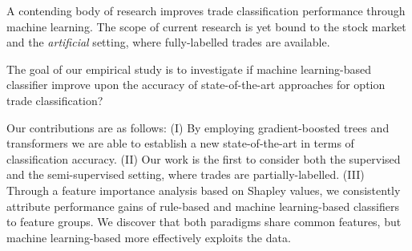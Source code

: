 A contending body of research \autocites{blazejewskiLocalNonParametricModel2005}{rosenthalModelingTradeDirection2012}{ronenMachineLearningTrade2022} improves trade classification performance through machine learning. The scope of current research is yet bound to the stock market and the \textit{artificial} setting, where fully-labelled trades are available. 

The goal of our empirical study is to investigate if  machine learning-based classifier improve upon the accuracy of state-of-the-art approaches for option trade classification?

Our contributions are as follows: (I) By employing gradient-boosted trees and transformers we are able to establish a new state-of-the-art in terms of classification accuracy. (II) Our work is the first to consider both the supervised and the semi-supervised setting, where trades are partially-labelled. (III) Through a feature importance analysis based on Shapley values, we consistently attribute performance gains of rule-based and machine learning-based classifiers to feature groups. We discover that both paradigms share common features, but machine learning-based more effectively exploits the data. %













